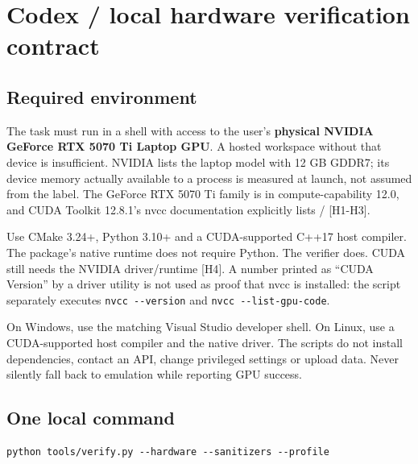 \documentclass[11pt,a4paper]{article}
\begin{document}
\clearpage

\section{Codex / local hardware verification contract}\label{codex-local-hardware-verification-contract}

\subsection{Required environment}\label{required-environment}

The task must run in a shell with access to the user's \textbf{physical NVIDIA GeForce RTX 5070 Ti Laptop GPU}. A hosted workspace without that device is insufficient. NVIDIA lists the laptop model with 12 GB GDDR7; its device memory actually available to a process is measured at launch, not assumed from the label. The GeForce RTX 5070 Ti family is in compute-capability 12.0, and CUDA Toolkit 12.8.1's nvcc documentation explicitly lists  /  {[}H1-H3{]}.

Use CMake 3.24+, Python 3.10+ and a CUDA-supported C++17 host compiler. The package's native runtime does not require Python. The verifier does. CUDA still needs the NVIDIA driver/runtime {[}H4{]}. A number printed as ``CUDA Version'' by a driver utility is not used as proof that nvcc is installed: the script separately executes \texttt{nvcc\ -\/-version} and \texttt{nvcc\ -\/-list-gpu-code}.

On Windows, use the matching Visual Studio developer shell. On Linux, use a CUDA-supported host compiler and the native driver. The scripts do not install dependencies, contact an API, change privileged settings or upload data. Never silently fall back to emulation while reporting GPU success.

\subsection{One local command}\label{one-local-command}

\par
\begin{minipage}{\linewidth}
\begin{verbatim}
python tools/verify.py --hardware --sanitizers --profile
\end{verbatim}
\end{minipage}
\par
\end{document}
